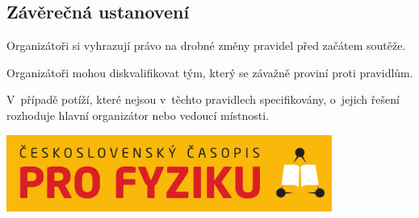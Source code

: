 \documentclass[fykos,\classoptions]{fksgeneric}
\begin{document}
\subsection*{Závěrečná ustanovení}
\begin{compactitem}
	\item Organizátoři si vyhrazují právo na drobné změny pravidel před začátem
	soutěže.
	\item Organizátoři mohou diskvalifikovat tým, který se závažně proviní proti
	pravidlům.
	\item V~případě potíží, které nejsou v~těchto pravidlech specifikovány,
	o~jejich řešení rozhoduje hlavní organizátor nebo vedoucí místnosti.
\end{compactitem}


\vskip0.4cm
\begin{center}
	\includegraphics[width=0.8\textwidth]{graphics/logo-casopis.pdf}
\end{center}
\end{document}
